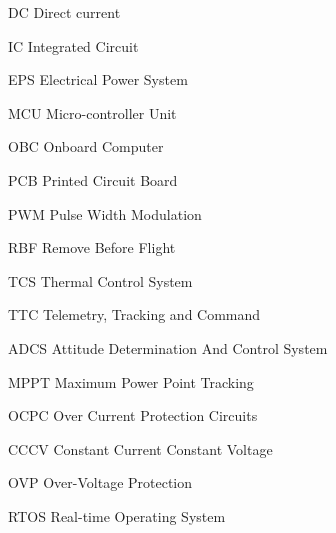 \begin{abbrv}
	
	\item[DC]  Direct current
	\item[IC]  Integrated Circuit
	\item[EPS] Electrical Power System
	 \item[MCU] Micro-controller Unit
	
	\item[OBC] Onboard Computer
	\item[PCB] Printed Circuit Board 
	\item[PWM] Pulse Width Modulation
	\item[RBF] Remove Before Flight
	\item[TCS] Thermal Control System
	\item[TTC] Telemetry, Tracking and Command
	\item[ADCS] Attitude Determination And Control System
	\item[MPPT] Maximum Power Point Tracking
	\item[OCPC] Over Current Protection Circuits
    \item[CCCV] Constant Current Constant Voltage
    \item[OVP] Over-Voltage Protection
    \item[RTOS] Real-time Operating System
  
\end{abbrv}

